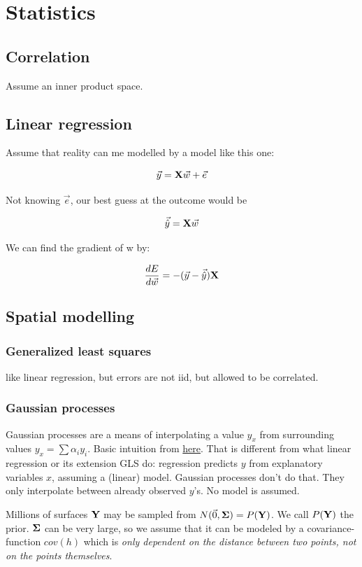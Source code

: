 \section{Statistics}

\subsection{Correlation}
Assume an inner product space.

\subsection{Linear regression}

Assume that reality can me modelled by a model like this one: 

$$ \vec{y} = \mathbf{X} \vec{w} + \vec{e} $$

Not knowing $\vec{e}$, our best guess at the outcome would be 

$$ \vec{\hat{y}} = \mathbf{X} \vec{w} $$

We can find the gradient of w by:

$$  \frac{ \mathop{dE} }{ \mathop{d\vec{w}} }  = -  (\vec{y} - \vec{\hat{y}}) \mathbf{X}  $$



\subsection{Spatial modelling}

\subsubsection{Generalized least squares}
like linear regression, but errors are not iid, but allowed to be correlated.

\subsubsection{Gaussian processes}
Gaussian processes are a means of interpolating a value $y_x$ from surrounding values $y_x = \sum \alpha_i y_i$. Basic intuition from \href{https://bookdown.org/rbg/surrogates/chap5.html}{here}.
That is different from what linear regression or its extension GLS do: regression predicts $y$ from explanatory variables $x$, assuming a (linear) model.
Gaussian processes don't do that. They only interpolate between already observed $y$'s. No model is assumed.

Millions of surfaces $\mathbf{Y}$ may be sampled from $N(\vec{0}, \mathbf{\Sigma}) = P(\mathbf{Y})$.
We call $P(\mathbf{Y})$ the prior. $\mathbf{\Sigma}$ can be very large, so we assume that it can be modeled by a covariance-function $cov(h)$ which is \emph{only dependent on the distance between two points, not on the points themselves}.

